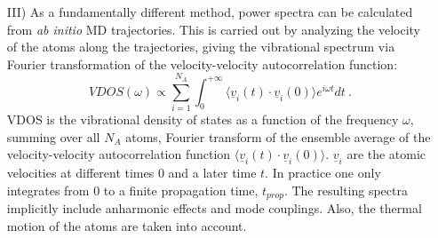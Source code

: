 \documentclass[11pt,DIV=13,BCOR=5mm,a4paper,headinclude]{scrbook}
\renewcommand{\vec}[1]{\underline{#1}}
\begin{document}
\begin{itemize}
\item[III)] As a fundamentally different method, power spectra can be calculated from \textit{ab initio} MD trajectories\cite{VAC}.
This is carried out by analyzing the velocity of the atoms along the trajectories, giving the vibrational spectrum via Fourier transformation of the velocity-velocity autocorrelation function:
\begin{equation}
 VDOS(\omega)\propto \sum_{i=1}^{N_A}\int_{0}^{+\infty}\langle\vec{v}_i(t)\cdot \vec{v}_i(0)\rangle e^{i\omega t}dt ~.
\end{equation}
VDOS is the vibrational density of states as a function of the frequency $\omega$, summing over all $N_A$ atoms, Fourier transform of the ensemble average of the velocity-velocity autocorrelation function $\langle\vec{v}_i(t)\cdot \vec{v}_i(0)\rangle$.
$\vec{v}_i$ are the atomic velocities at different times $0$ and a later time $t$.
In practice one only integrates from 0 to a finite propagation time, $t_{prop}$.
The resulting spectra implicitly include anharmonic effects and mode couplings.
Also, the thermal motion of the atoms are taken into account\cite{hornicek2007,hudecova2012}.
\end{itemize}
\end{document}
